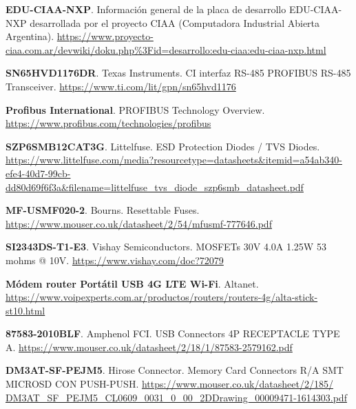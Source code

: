 \begin{thebibliography}{30}
\textbf{EDU-CIAA-NXP}. Información general de la placa de desarrollo EDU-CIAA-NXP desarrollada por el proyecto CIAA (Computadora Industrial Abierta Argentina). \href{https://www.proyecto-ciaa.com.ar/devwiki/doku.php%3Fid=desarrollo:edu-ciaa:edu-ciaa-nxp.html}{https://www.proyecto-ciaa.com.ar/devwiki/doku.php\%3Fid=desarrollo:edu-ciaa:edu-ciaa-nxp.html}

\textbf{SN65HVD1176DR}. Texas Instruments. CI interfaz RS-485 PROFIBUS RS-485 Transceiver. 
\href{https://www.ti.com/lit/gpn/sn65hvd1176}{https://www.ti.com/lit/gpn/sn65hvd1176}

\textbf{Profibus International}. PROFIBUS Technology Overview.
\href{https://www.profibus.com/technologies/profibus}{https://www.profibus.com/technologies/profibus}

\textbf{SZP6SMB12CAT3G}. Littelfuse. ESD Protection Diodes / TVS Diodes.
\href{https://www.littelfuse.com/media?resourcetype=datasheets&itemid=a54ab340-efe4-40d7-99cb-dd80d69f6f3a&filename=littelfuse_tvs_diode_szp6smb_datasheet.pdf}{https://www.littelfuse.com/media?resourcetype=datasheets\&itemid=a54ab340-efe4-40d7-99cb-dd80d69f6f3a\&filename=littelfuse\_tvs\_diode\_szp6smb\_datasheet.pdf}


\textbf{MF-USMF020-2}. Bourns. Resettable Fuses.
\href{https://www.mouser.co.uk/datasheet/2/54/mfusmf-777646.pdf}{https://www.mouser.co.uk/datasheet/2/54/mfusmf-777646.pdf}


\textbf{SI2343DS-T1-E3}. Vishay Semiconductors. MOSFETs 30V 4.0A 1.25W 53 mohms @ 10V. 
\href{https://www.vishay.com/doc?72079}{https://www.vishay.com/doc?72079}


\textbf{Módem router Portátil USB 4G LTE Wi-Fi}. Altanet.
\href{https://www.voipexperts.com.ar/productos/routers/routers-4g/alta-stick-st10.html}{https://www.voipexperts.com.ar/productos/routers/routers-4g/alta-stick-st10.html}


\textbf{87583-2010BLF}. Amphenol FCI. USB Connectors 4P RECEPTACLE TYPE A.
\href{https://www.mouser.co.uk/datasheet/2/18/1/87583-2579162.pdf}{https://www.mouser.co.uk/datasheet/2/18/1/87583-2579162.pdf}


\textbf{DM3AT-SF-PEJM5}. Hirose Connector. Memory Card Connectors R/A SMT MICROSD CON PUSH-PUSH.
\href{https://www.mouser.co.uk/datasheet/2/185/DM3AT_SF_PEJM5_CL0609_0031_0_00_2DDrawing_00009471-1614303.pdf}{https://www.mouser.co.uk/datasheet/2/185/ DM3AT\_SF\_PEJM5\_CL0609\_0031\_0\_00\_2DDrawing\_00009471-1614303.pdf}



\end{thebibliography}
